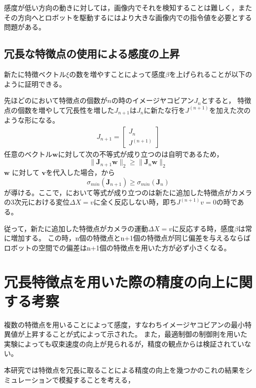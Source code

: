 \documentclass[fleqn]{jreport}
\begin{document}
感度が低い方向の動きに対しては，画像内でそれを検知することは難しく，またその方向へとロボットを駆動するにはより大きな画像内での指令値を必要とする問題がある。

\subsection{冗長な特徴点の使用による感度の上昇}
新たに特徴ベクトル$\xi$の数を増やすことによって感度$\beta$を上げられることが以下のように証明できる。

先ほどのにおいて特徴点の個数が$n$の時のイメージヤコビアン$J_{n}$とすると，
特徴点の個数を増やして冗長性を増した$J_{n+1}$は$J_{n}$に新たな行を$J^{(n+1)}$を加えた次のような形になる。
\begin{align}
	J_{n+1} = \left[
	\begin{matrix}
		J_n \\
		J^{(n+1)}
	\end{matrix}
	\right]
\end{align}
任意のベクトル$\bm{w}$に対して次の不等式が成り立つのは自明であるため，
\begin{equation}
	\| \bm{J}_{n+1}\bm{w} \|_2 \geq \| \bm{J}_n\bm{w} \|_2
\end{equation}
$\bm{w}$ に対して $\bm{v}$を代入した場合，から
\begin{equation}
	\sigma_{min}(\bm{J}_{n+1}) \geq \sigma_{min}(\bm{J}_n)
	\label{eq:beta_grow}
\end{equation}
が導ける。ここで，において等式が成り立つのは新たに追加した特徴点がカメラの3次元における変位$\Delta X =v$に全く反応しない時，即ち$J^{(n+1)} v=0$の時である。

従って，新たに追加した特徴点がカメラの運動$\Delta X =v$に反応する時，感度$\beta$は常に増加する。
この時，n個の特徴点とn+1個の特徴点が同じ偏差を与えるならばロボットの空間での偏差はn+1個の特徴点を用いた方が必ず小さくなる。

\section{冗長特徴点を用いた際の精度の向上に関する考察}
複数の特徴点を用いることによって感度，すなわちイメージヤコビアンの最小特異値が上昇することが式によって示された。
また，最適制御の制御則を用いた実験によっても収束速度の向上が見られるが，精度の観点からは検証されていない。

本研究では特徴点を冗長に取ることによる精度の向上を幾つかのこれの結果をシミュレーションで模擬することを考える，
\end{document}
